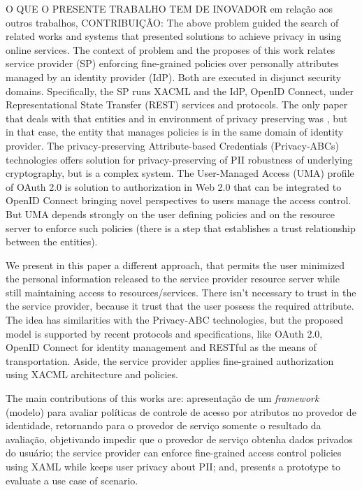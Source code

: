 \documentclass{doublecol-new}
\begin{document}
O QUE O PRESENTE TRABALHO TEM DE INOVADOR em relação aos outros trabalhos, CONTRIBUIÇÃO:
The above problem guided the search of related works and systems that presented solutions to achieve privacy in using online services. The context of problem and the proposes of this work relates service provider (SP) enforcing fine-grained policies over personally attributes managed by an identity provider (IdP). Both are executed in disjunct security domains. Specifically, the SP runs XACML and the IdP, OpenID Connect, under Representational State Transfer (REST) services and protocols. The only paper that deals with that entities and in environment of privacy preserving was \citep{ma2015cloud}, but in that case, the entity that manages policies is in the same domain of identity provider. The privacy-preserving Attribute-based Credentials (Privacy-ABCs) technologies \cite{camenisch2009credential,dagdee2011extending} offers solution for privacy-preserving of PII robustness of underlying cryptography, but is a complex system. The User-Managed Access (UMA) profile of OAuth 2.0 \cite{hardjono-oauth-umacore-14} is solution to authorization in Web 2.0 that can be integrated to OpenID Connect bringing novel perspectives to users manage the access control. But UMA depends strongly on the user defining policies and on the resource server to enforce such policies (there is a step that establishes a trust relationship between the entities). 

We present in this paper a different approach, that permits the user minimized the personal information released to the service provider resource server while still maintaining access to resources/services. There isn't necessary to trust in the the service provider, because it trust that the user possess the required attribute. The idea has similarities with the Privacy-ABC technologies, but the proposed model is supported by recent protocols and specifications, like OAuth 2.0, OpenID Connect for identity management and RESTful as the means of transportation. Aside, the service provider applies fine-grained authorization using XACML architecture and policies.

The main contributions of this works are: apresentação de um \textit{framework} (modelo) para avaliar políticas de controle de acesso por atributos no provedor de identidade, retornando para o provedor de serviço somente o resultado da avaliação, objetivando impedir que o provedor de serviço obtenha dados privados do usuário; the service provider can enforce fine-grained access control policies using XAML while keeps user privacy about PII; and, presents a prototype to evaluate a use case of scenario.
\end{document}
